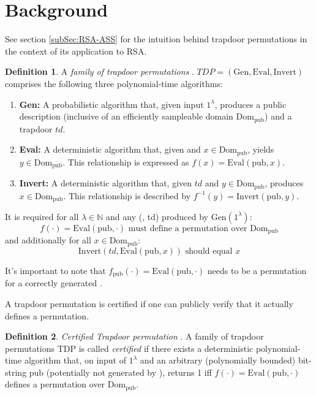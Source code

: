 \documentclass[]{final_report}
\theoremstyle{definition}
\newtheorem{definition}{Definition}[chapter]
\begin{document}
\section{Background}
See section \ref{subSec:RSA-ASS} for the intuition behind trapdoor permutations in the context of its application to RSA.
\begin{definition}
\label{def:TDP}
A \textit{family of trapdoor permutations} \cite{10.1145/147508.147537}. \( TDP = (\text{Gen}, \text{Eval}, \text{Invert}) \) comprises the following three polynomial-time algorithms:
\begin{enumerate}
    \item \textbf{Gen:} A probabilistic algorithm that, given input \( 1^{\lambda} \), produces a public description  (inclusive of an efficiently sampleable domain \( \text{Dom}_{\text{pub}} \)) and a trapdoor \( td \).
    
    \item \textbf{Eval:} A deterministic algorithm that, given  and \( x \in \text{Dom}_{\text{pub}} \), yields \( y \in \text{Dom}_{\text{pub}} \). This relationship is expressed as \( f(x) = \text{Eval}(\text{pub}, x) \).
    
    \item \textbf{Invert:} A deterministic algorithm that, given \( td \) and \( y \in \text{Dom}_{\text{pub}} \), produces \( x \in \text{Dom}_{\text{pub}} \). This relationship is described by \( f^{-1}(y) = \text{Invert}(\text{pub}, y) \).
\end{enumerate}

It is required for all \( \lambda \in \mathbb{N} \) and any (, td) produced by \(\text{Gen}(1^{\lambda})\):
\[ f(\cdot) = \text{Eval}(\text{pub}, \cdot) \text{ must define a permutation over } \text{Dom}_{\text{pub}} \]
and additionally for all \( x \in \text{Dom}_{\text{pub}} \):
\[ \text{Invert}(td, \text{Eval}(\text{pub}, x)) \text{ should equal } x \]

It's important to note that \( f_{\text{pub}}(\cdot) = \text{Eval}(\text{pub}, \cdot) \) needs to be a permutation for a correctly generated . 
\end{definition}

A trapdoor permutation is certified if one can publicly verify that it actually defines a permutation. 

\begin{definition} \textit{Certified Trapdoor permutation} \cite{10.1007/3-540-48071-4_31, bellare1996certifying, 10.1007/978-3-642-34961-4_25}.
\label{def:CTDP}
A family of trapdoor permutations \( \text{TDP} \) is called \textit{certified} if there exists a deterministic polynomial-time algorithm  that, on input of \( 1^{\lambda} \) and an arbitrary (polynomially bounded) bit-string \( \text{pub} \) (potentially not generated by ), returns 1 iff \( f(\cdot) = \text{Eval}(\text{pub}, \cdot) \) defines a permutation over \( \text{Dom}_{\text{pub}} \).
\end{definition}
\end{document}
